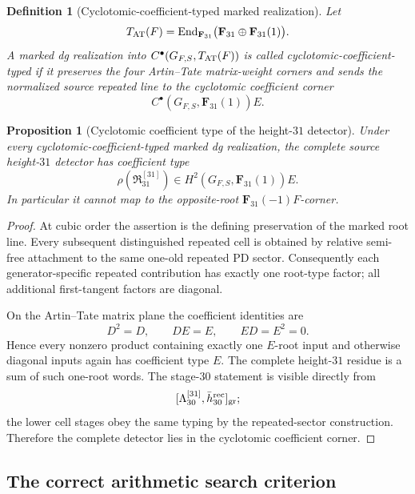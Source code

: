 \documentclass[11pt]{article}
\newtheorem{proposition}[theorem]{Proposition}
\newtheorem{definition}[theorem]{Definition}
\theoremstyle{remark}
\begin{document}
\begin{definition}[Cyclotomic-coefficient-typed marked realization]
\label{def:v073-root-typed-realization}
Let
\[
 T_{\rm AT}(F)
 =
 \operatorname{End}_{\mathbf F_{31}}
 \bigl(\mathbf F_{31}\oplus\mathbf F_{31}(1)\bigr).
\]
A marked dg realization into
\(C^\bullet(G_{F,S},T_{\rm AT}(F))\) is called
\emph{cyclotomic-coefficient-typed} if it preserves the four Artin--Tate matrix-weight
corners and sends the normalized source repeated line to the
cyclotomic coefficient corner
\[
 C^\bullet(G_{F,S},\mathbf F_{31}(1))E.
\]
\end{definition}

\begin{proposition}[Cyclotomic coefficient type of the height-\(31\) detector]
\label{prop:v073-one-root-typing}
Under every cyclotomic-coefficient-typed marked dg realization, the complete source
height-\(31\) detector has coefficient type
\begin{equation}
 \boxed{
 \rho(\mathfrak R_{31}^{[31]})
 \in
 H^2(G_{F,S},\mathbf F_{31}(1))E.}
 \label{eq:v073-root-valued-detector}
\end{equation}
In particular it cannot map to the opposite-root
\(\mathbf F_{31}(-1)F\)-corner.
\end{proposition}

\begin{proof}
At cubic order the assertion is the defining preservation of the marked
root line.  Every subsequent distinguished repeated cell is obtained by
relative semi-free attachment to the same one-old repeated PD sector.
Consequently each generator-specific repeated contribution has exactly one
root-type factor; all additional first-tangent factors are diagonal.

On the Artin--Tate matrix plane the coefficient identities are
\[
 D^2=D,\qquad DE=E,\qquad ED=E^2=0.
\]
Hence every nonzero product containing exactly one \(E\)-root input and
otherwise diagonal inputs again has coefficient type \(E\).
The complete height-\(31\) residue is a sum of such one-root words.  The
stage-\(30\) statement is visible directly from
\[
 [\Lambda_{30}^{[31]},\bar h_{30}^{\rm rec}]_{\rm gr};
\]
the lower cell stages obey the same typing by the repeated-sector
construction.  Therefore the complete detector lies in the cyclotomic coefficient corner.
\end{proof}



\subsection{The correct arithmetic search criterion}
\end{document}
